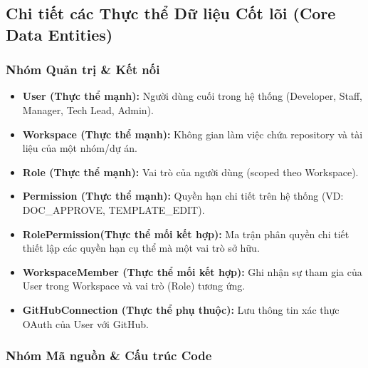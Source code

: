 \subsection{Chi tiết các Thực thể Dữ liệu Cốt lõi (Core Data Entities)}
\label{sec:core-data-entities}


\subsubsection{Nhóm Quản trị \& Kết nối}

\begin{itemize}

    \item \textbf{User (Thực thể mạnh):}
    Người dùng cuối trong hệ thống (Developer, Staff, Manager,
    Tech Lead, Admin).

    \item \textbf{Workspace (Thực thể mạnh):}
    Không gian làm việc chứa repository và tài liệu của một nhóm/dự án.

    \item \textbf{Role (Thực thể mạnh):}
    Vai trò của người dùng (scoped theo Workspace).

    \item \textbf{Permission (Thực thể mạnh):}
    Quyền hạn chi tiết trên hệ thống
    (VD: DOC\_APPROVE, TEMPLATE\_EDIT).
    \item\textbf{RolePermission(Thực thể mối kết hợp):}
Ma trận phân quyền chi tiết thiết lập các quyền hạn cụ thể mà một vai trò sở hữu.
    \item \textbf{WorkspaceMember (Thực thể mối kết hợp):}
    Ghi nhận sự tham gia của User trong Workspace và vai trò (Role)
    tương ứng.

    \item \textbf{GitHubConnection (Thực thể phụ thuộc):}
    Lưu thông tin xác thực OAuth của User với GitHub.

    

\end{itemize}


\subsubsection{Nhóm Mã nguồn \& Cấu trúc Code}

